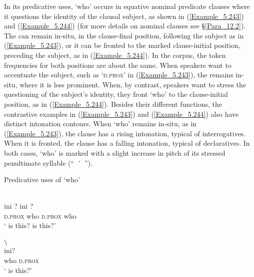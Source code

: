 In its predicative uses,  ‘who’ occurs in equative nominal predicate clauses where it questions the identity of the clausal subject, as shown in (\ref{Example_5.243}) and (\ref{Example_5.244}) (for more details on nominal clauses see §\ref{Para_12.2}). The  can remain in-situ, in the clause-final position, following the subject as in (\ref{Example_5.243}), or it can be fronted to the marked clause-initial position, preceding the subject, as in (\ref{Example_5.244}). In the corpus, the token frequencies for both positions are about the same. When speakers want to accentuate the subject, such as  ‘\textsc{d.prox}’ in (\ref{Example_5.243}), the  remains in-situ, where it is less prominent. When, by contrast, speakers want to stress the questioning of the subject’s identity, they front  ‘who’ to the clause-initial position, as in (\ref{Example_5.244}). Besides their different functions, the contrastive examples in (\ref{Example_5.243}) and (\ref{Example_5.244}) also have distinct intonation contours. When  ‘who’ remains in-situ, as in (\ref{Example_5.243}), the clause has a rising intonation, typical of interrogatives. When it is fronted, the clause has a falling intonation, typical of declaratives. In both cases,  ‘who’ is marked with a slight increase in pitch of its stressed penultimate syllable (“~\'{~}~”).


\begin{styleExampleTitle}
Predicative uses of  ‘who’
\end{styleExampleTitle}

\ea
\label{Example_5.243}
\glll {\textstyleChBold{{} -- {} -- }}\hspace{7mm} {}\hspace{7mm}  {\textstyleChBold{{} -- {} -- }}\hspace{7mm}  {}\\ %
 {ini}  {?}  {ini}  {?}\\
 {\textsc{d.prox}}  {who}  {\textsc{d.prox}}  {who}\\
\glt 
‘ is this?  is this?’ \textstyleExampleSource{[080916-001-CvNP.0006]}
\z

\ea
\label{Example_5.244}
\glll {\textstyleChBold{{} -- {} -- }}\hspace{7mm} {\textstyleChBold{{} -- }\textbf{\textsubscript{{\textbackslash}}}}\\ %
   ini?\\
 who  \textsc{d.prox}\\
\glt 
‘ is this?’ \textstyleExampleSource{[081011-023-Cv.0104]}
\z


